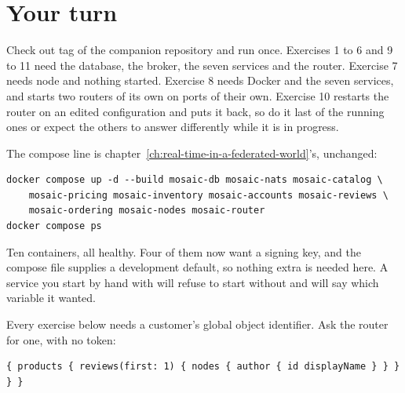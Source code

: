 \section*{Your turn}

Check out tag  of the companion repository and run 
once. Exercises 1 to 6 and 9 to 11 need the database, the broker, the seven
services and the router. Exercise 7 needs node and nothing started. Exercise 8
needs Docker and the seven services, and starts two routers of its own on ports
of their own. Exercise 10 restarts the router on an edited configuration and
puts it back, so do it last of the running ones or expect the others to answer
differently while it is in progress.

The compose line is chapter~\ref{ch:real-time-in-a-federated-world}'s, unchanged:

\begin{verbatim}
docker compose up -d --build mosaic-db mosaic-nats mosaic-catalog \
    mosaic-pricing mosaic-inventory mosaic-accounts mosaic-reviews \
    mosaic-ordering mosaic-nodes mosaic-router
docker compose ps
\end{verbatim}

Ten containers, all healthy. Four of them now want a signing key, and the
compose file supplies a development default, so nothing extra is needed here. A
service you start by hand with \code{dotnet run} will refuse to start without
\code{MOSAIC\_JWT\_SECRET} and will say which variable it wanted.

Every exercise below needs a customer's global object identifier. Ask the router
for one, with no token:

\begin{verbatim}
{ products { reviews(first: 1) { nodes { author { id displayName } } } } }
\end{verbatim}

